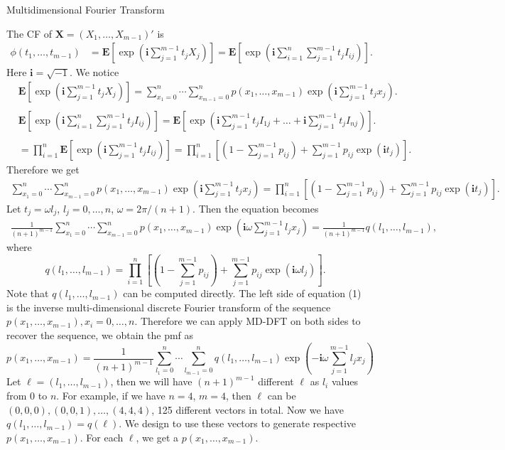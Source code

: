 \documentclass[12pt]{article}
\newcommand{\EE}{\mathbf{E}}
\newcommand{\ivec}{{\boldsymbol{i}}}
\begin{document}
Multidimensional Fourier Transform


The CF of $\boldsymbol{X}=(X_1, \dots, X_{m-1})'$ is
\begin{align*}
\phi(t_1, \dots, t_{m-1}) & = \EE\left[\exp\left(\ivec\sum_{j=1}^{m-1}t_jX_j\right)\right]=\EE\left[\exp\left(\ivec\sum_{i = 1}^n \sum_{j=1}^{m-1}t_j I_{ij}\right)\right].
\end{align*}
Here $\ivec=\sqrt{-1}$. We notice\\
\begin{equation*}
\begin{split}
  &\EE\left[\exp\left(\ivec\sum_{j=1}^{m-1}t_jX_j\right)\right] = \sum_{x_1 = 0}^{n}\cdots \sum_{x_{m-1} = 0}^n p(x_1,\ldots,x_{m-1})\exp\left(\ivec\sum_{j=1}^{m-1}t_jx_j\right).\\
  \\
  &\EE\left[\exp\left(\ivec\sum_{i = 1}^n \sum_{j=1}^{m-1}t_j I_{ij}\right)\right] = \EE\left[ \exp\left( \ivec\sum_{j=1}^{m-1} t_jI_{1j} + \dots + \ivec\sum_{j=1}^{m-1} t_jI_{nj}\right)\right].\\
  \\
  & = \prod_{i=1}^n \EE\left[ \exp\left( \ivec \sum_{j=1}^{m-1} t_j I_{ij}\right)\right] = \prod_{i=1}^n \left[(1 - \sum_{j=1}^{m-1}p_{ij})+\sum_{j=1}^{m-1}p_{ij}\exp(\ivec t_j)\right].
\end{split}
\end{equation*}
Therefore we get
\begin{align*}
\sum_{x_1 = 0}^{n}\cdots \sum_{x_{m-1} = 0}^n p(x_1,\ldots,x_{m-1})\exp\left(\ivec\sum_{j=1}^{m-1}t_jx_j\right)= \prod_{i=1}^{n}\left[(1 - \sum_{j=1}^{m-1}p_{ij})+\sum_{j=1}^{m-1}p_{ij}\exp(\ivec t_j)\right].
\end{align*}
Let $t_j = \omega l_j$, $l_j = 0, \ldots, n$, $\omega = 2\pi/(n+1)$. Then the equation becomes
\begin{align}
\frac{1}{(n+1)^{m-1}} \sum_{x_1 = 0}^{n}\cdots \sum_{x_{m-1} = 0}^n p(x_1,\ldots,x_{m-1}) \exp\left(\ivec\omega\sum_{j=1}^{m-1}l_j x_j\right)= \frac{1}{(n+1)^{m-1}} q(l_1, \ldots, l_{m-1}),
\end{align}
where
$$ q(l_1, \ldots, l_{m-1})=\prod_{i=1}^{n}\left[(1 - \sum_{j=1}^{m-1}p_{ij})+\sum_{j=1}^{m-1}p_{ij}\exp(\ivec \omega l_j)\right].$$	
Note that $q(l_1, \ldots, l_{m-1})$ can be computed directly. The left side of equation (1) is the inverse multi-dimensional discrete Fourier transform of the sequence $ p(x_1,\ldots,x_{m-1}), x_i = 0 , \dots, n$. Therefore we can apply MD-DFT on both sides to recover the sequence, we obtain the pmf as
\begin{equation}
p(x_1, \ldots, x_{m-1}) = \frac{1}{(n+1)^{m-1}}\sum_{l_1 = 0}^{n}\cdots \sum_{l_{m-1} = 0}^n q(l_1, \ldots, l_{m-1}) \exp\left(-\ivec\omega\sum_{j=1}^{m-1}l_j x_j\right)
\end{equation}
Let $\ell = (l_1,\dots,l_{m-1})$, then we will have $(n
+1)^{m-1}$ different $\ell$ as $l_i$ values from $0$ to $n$. For example, if we have $n=4$, $m=4$, then $\ell$ can be $(0, 0, 0), (0, 0, 1), \dots, (4, 4, 4)$, 125 different vectors in total. Now we have $q(l_1,\dots,l_{m-1}) = q(\ell)$. We design to use these vectors to generate respective $p(x_1,\dots,x_{m-1})$. For each $\ell$, we get a $p(x_1,\dots,x_{m-1})$.
\end{document}
